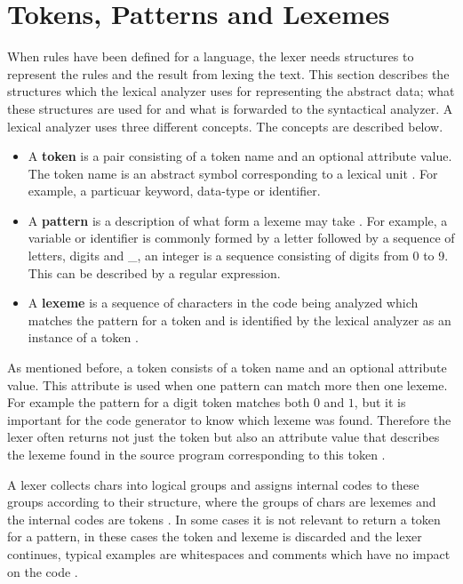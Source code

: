 \section{Tokens, Patterns and Lexemes}
When rules have been defined for a language, the lexer needs structures to
represent the rules and the result from lexing the text.
This section describes the structures which the lexical analyzer uses
for representing the abstract data; what these structures are used for and what is
forwarded to the syntactical analyzer.
\newpage
A lexical analyzer uses three different concepts. The concepts are described
below.
\begin{itemize}
  \item A \textbf{token} is a pair consisting of a token name and an optional attribute value. The
token name is an abstract symbol corresponding to a lexical unit \cite{Aho2006}.
For example, a particuar keyword, data-type or identifier.
  \item A \textbf{pattern} is a description of what form a lexeme may take \cite{Aho2006}.
For example, a variable or identifier is commonly formed by a letter followed by
a sequence of letters, digits and \_, an integer is a sequence consisting of
digits from 0 to 9. This can be described by a regular expression.
  \item A \textbf{lexeme} is a sequence of characters in the code being analyzed which
matches the pattern for a token and is identified by the lexical analyzer as an
instance of a token \cite{Aho2006}.
\end{itemize}
As mentioned before, a token consists of a token name and an optional attribute value.
This attribute is used when one pattern can match more then one lexeme.
For example the pattern for a digit token matches both $0$ and $1$,
but it is important for the code generator to know which lexeme was found.
Therefore the lexer often returns not just the token but also an attribute value
that describes the lexeme found in the source program corresponding to this
token \cite{Aho2006}.

A lexer collects chars into logical groups and assigns 
internal codes to these groups according to their structure, 
where the groups of chars are lexemes and the internal codes are tokens \cite{sebesta2012}.
In some cases it is not relevant to return a token for a pattern, in these
cases the token and lexeme is discarded and the lexer continues,
typical examples are whitespaces and comments which have no impact on
the code \cite{Aho2006}.

